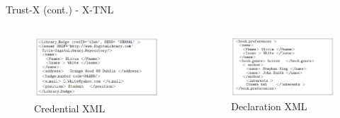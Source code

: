 \documentclass[11pt]{beamer}
\begin{document}
\begin{frame}{Trust-X (cont.) - X-TNL}
\begin{columns}
\begin{column}{.5\textwidth}
\begin{figure}
\centering
\includegraphics[scale=.3]{img/trustx-credential.PNG}
\caption{Credential XML}
\label{fig:trust_x_credential}
\end{figure}
\end{column}
\begin{column}{.5\textwidth}
\begin{figure}
\centering
\includegraphics[scale=.3]{img/trustx-declaration.PNG}
\caption{Declaration XML}
\label{fig:trust_x_declaration}
\end{figure}
\end{column}
\end{columns}

\end{frame}
\end{document}
